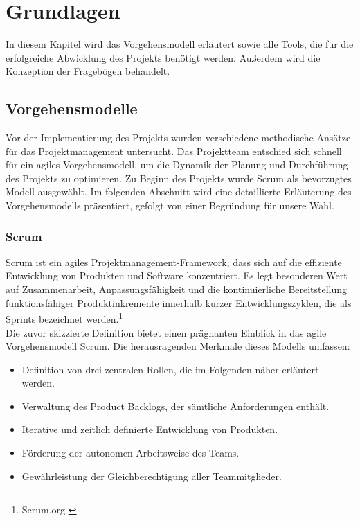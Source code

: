 \chapter{Grundlagen}
In diesem Kapitel wird das Vorgehensmodell erläutert sowie alle Tools, die für die erfolgreiche Abwicklung des Projekts
benötigt werden. Außerdem wird die Konzeption der Fragebögen behandelt.

\section{Vorgehensmodelle}
Vor der Implementierung des Projekts wurden verschiedene methodische Ansätze für das Projektmanagement untersucht. Das
Projektteam entschied sich schnell für ein agiles Vorgehensmodell, um die Dynamik der Planung und Durchführung des Projekts
zu optimieren. Zu Beginn des Projekts wurde Scrum als bevorzugtes Modell ausgewählt. Im folgenden Abschnitt wird eine
detaillierte Erläuterung des Vorgehensmodells präsentiert, gefolgt von einer Begründung für unsere Wahl.

\subsection{Scrum}
Scrum ist ein agiles Projektmanagement-Framework, dass sich auf die effiziente Entwicklung von Produkten und Software
konzentriert. Es legt besonderen Wert auf Zusammenarbeit, Anpassungsfähigkeit und die kontinuierliche Bereitstellung
funktionsfähiger Produktinkremente innerhalb kurzer Entwicklungszyklen, die als Sprints bezeichnet werden.\footnote{Scrum.org \cite{What is Scrum}}\\

Die zuvor skizzierte Definition bietet einen prägnanten Einblick in das agile Vorgehensmodell Scrum. Die herausragenden Merkmale dieses Modells umfassen:

\begin{itemize}
    \item Definition von drei zentralen Rollen, die im Folgenden näher erläutert werden.
    \item Verwaltung des Product Backlogs, der sämtliche Anforderungen enthält.
    \item Iterative und zeitlich definierte Entwicklung von Produkten.
    \item Förderung der autonomen Arbeitsweise des Teams.
    \item Gewährleistung der Gleichberechtigung aller Teammitglieder.
\end{itemize}

